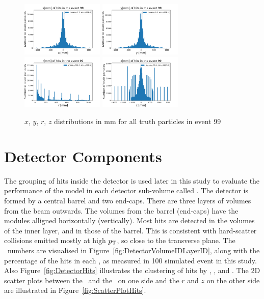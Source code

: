 \begin{figure}[htb]
\centering
\includegraphics[width=0.35\textwidth]{plots/DataExploration_x.pdf}
\includegraphics[width=0.35\textwidth]{plots/DataExploration_y.pdf}\\
\includegraphics[width=0.35\textwidth]{plots/DataExploration_r.pdf}
\includegraphics[width=0.35\textwidth]{plots/DataExploration_z.pdf}
\caption{$x$, $y$, $r$, $z$ distributions in mm for all truth particles in event 99}
\label{fig:ReconstructedHits}
\end{figure}

\section{Detector Components}

The grouping of hits inside the detector is used later in this study to evaluate the performance of the model in each detector sub-volume called \volumeID. The detector is formed by a central barrel and two end-caps. There are three layers of volumes from the beam outwards. The volumes from the barrel (end-caps) have the modules alligned horizontally (vertically). Most hits are detected in the volumes of the inner layer, and in those of the barrel. This is consistent with hard-scatter collisions emitted mostly at high $p_{\mathrm{T}}$, so close to the transverse plane. The \volumeID~numbers are visualised in Figure~\ref{fig:DetectorVolumeIDLayerID}, along with the percentage of the hits in each \volumeID, as measured in 100 simulated event in this study. Also Figure~\ref{fig:DetectorHits} illustrates the clustering of hits by \volumeID, \layerID, and \moduleID. The 2D scatter plots between the \volumeID~and the \moduleID~on one side and the $r$ and $z$ on the other side are illustrated in Figure~\ref{fig:ScatterPlotHits}. 

